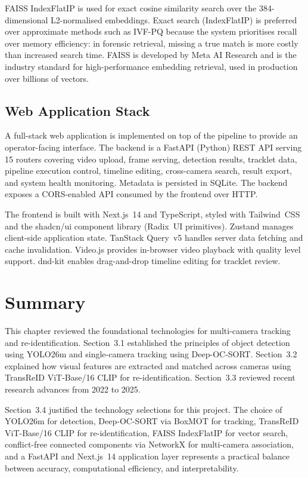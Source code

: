 FAISS IndexFlatIP is used for exact cosine similarity search over the 384-dimensional L2-normalised embeddings. Exact search (IndexFlatIP) is preferred over approximate methods such as IVF-PQ because the system prioritises recall over memory efficiency: in forensic retrieval, missing a true match is more costly than increased search time. FAISS is developed by Meta AI Research and is the industry standard for high-performance embedding retrieval, used in production over billions of vectors.

\subsection{Web Application Stack}

A full-stack web application is implemented on top of the pipeline to provide an operator-facing interface. The backend is a FastAPI (Python) REST API serving 15 routers covering video upload, frame serving, detection results, tracklet data, pipeline execution control, timeline editing, cross-camera search, result export, and system health monitoring. Metadata is persisted in SQLite. The backend exposes a CORS-enabled API consumed by the frontend over HTTP.

The frontend is built with Next.js~14 and TypeScript, styled with Tailwind~CSS and the shadcn/ui component library (Radix~UI primitives). Zustand manages client-side application state. TanStack Query~v5 handles server data fetching and cache invalidation. Video.js provides in-browser video playback with quality level support. dnd-kit enables drag-and-drop timeline editing for tracklet review.

\section{Summary}

This chapter reviewed the foundational technologies for multi-camera tracking and re-identification. Section~3.1 established the principles of object detection using YOLO26m and single-camera tracking using Deep-OC-SORT. Section~3.2 explained how visual features are extracted and matched across cameras using TransReID ViT-Base/16 CLIP for re-identification. Section~3.3 reviewed recent research advances from 2022 to 2025.

Section~3.4 justified the technology selections for this project. The choice of YOLO26m for detection, Deep-OC-SORT via BoxMOT for tracking, TransReID ViT-Base/16 CLIP for re-identification, FAISS IndexFlatIP for vector search, conflict-free connected components via NetworkX for multi-camera association, and a FastAPI and Next.js~14 application layer represents a practical balance between accuracy, computational efficiency, and interpretability.